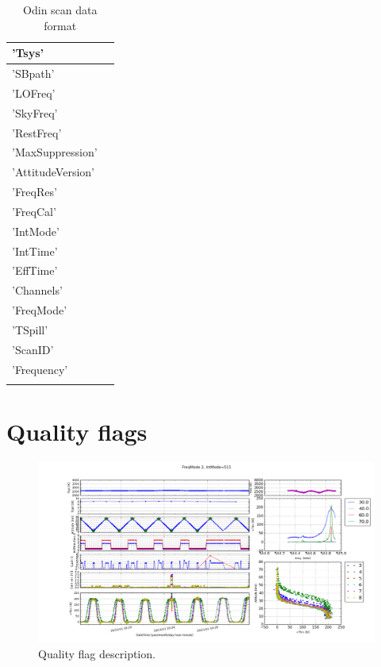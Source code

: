\begin{longtable}{| p{} | p{} |}
     'Tsys'           & \\ \hline
     'SBpath'          & \\ \hline
     'LOFreq'          & \\ \hline
     'SkyFreq'        & \\ \hline
     'RestFreq'      & \\ \hline
     'MaxSuppression' & \\ \hline
     'AttitudeVersion' & \\  \hline
     'FreqRes'        & \\ \hline
     'FreqCal'         & \\ \hline
     'IntMode'       & \\ \hline
     'IntTime'         & \\ \hline
     'EffTime'         & \\ \hline
     'Channels'       & \\ \hline
     'FreqMode'       & \\ \hline
     'TSpill'         & \\ \hline
     'ScanID'         & \\ \hline
     'Frequency'      & \\ \hline
\hline
\caption{ Odin scan data format}
\label{table:dataformat}
\end{longtable}



\section{Quality flags}


\begin{figure}[t]
\includegraphics[width=14cm]{quality_control.png}
\caption{Quality flag description.}
\label{fig:quality}
\end{figure}

